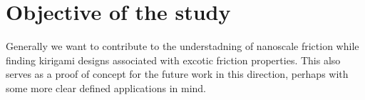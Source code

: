 

%
\section{Objective of the study}


Generally we want to contribute to the understadning of nanoscale friction while finding kirigami designs associated with excotic friction properties. This also serves as a proof of concept for the future work in this direction, perhaps with some more clear defined applications in mind. 

